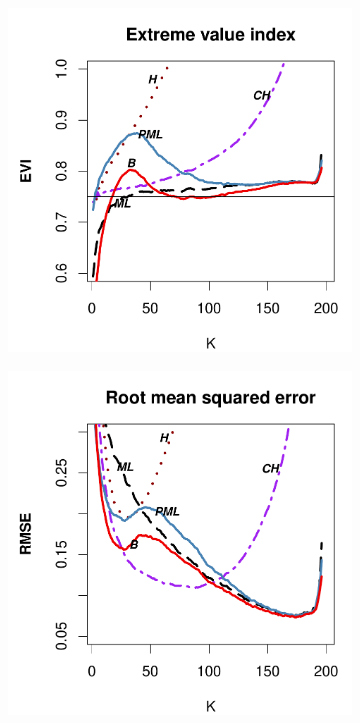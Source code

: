 	\begin{figure}[h]
		\centering
		\begin{subfigure}[h]{0.40\linewidth}
			\includegraphics[width=\textwidth]{./plots/paper1/EVI_Outputburr0,75200.pdf}
		\end{subfigure}
		\hspace{\fill}
		\begin{subfigure}[h]{0.40\linewidth}
			\includegraphics[width=\textwidth]{./plots/paper1/RMSE_Outputburr0,75200.pdf}

\end{subfigure}
\end{figure}
